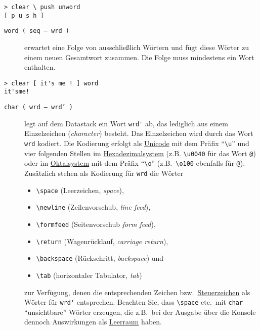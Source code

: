 \begin{verbatim}
> clear \ push unword
[ p u s h ]
\end{verbatim}

\begin{description}
\item[\texttt{word ( seq -- wrd )}] erwartet eine Folge von ausschließlich Wörtern und fügt diese Wörter zu einem neuen Gesamtwort zusammen. Die Folge muss mindestens ein Wort enthalten.
\end{description}

\begin{verbatim}
> clear [ it's me ! ] word
it'sme!
\end{verbatim}

\begin{description}
\item[\texttt{char ( wrd -- wrd' )}] legt auf dem Datastack ein Wort \verb|wrd'| ab, das lediglich aus einem Einzelzeichen (\emph{character}) besteht. Das Einzelzeichen wird durch das Wort \verb|wrd| kodiert. Die Kodierung erfolgt als \href{http://de.wikipedia.org/wiki/Unicode}{Unicode} mit dem Präfix "`\verb|\u|"' und vier folgenden Stellen im \href{http://de.wikipedia.org/wiki/Hexadezimalsystem}{Hexadezimalsystem} (z.B. \verb|\u0040| für das Wort \verb|@|) oder im \href{http://de.wikipedia.org/wiki/Oktalsystem}{Oktalsystem} mit dem Präfix "`\verb|\o|"' (z.B.\ \verb|\o100| ebenfalls für \verb|@|). Zusätzlich stehen als Kodierung für \verb|wrd| die Wörter
\begin{itemize}
\item \verb|\space| (Leerzeichen, \emph{space}),
\item \verb|\newline| (Zeilenvorschub, \emph{line feed}),
\item \verb|\formfeed| (Seitenvorschub \emph{form feed}),
\item \verb|\return| (Wagenrücklauf, \emph{carriage return}),
\item \verb|\backspace| (Rückschritt, \emph{backspace}) und
\item \verb|\tab| (horizontaler Tabulator, \emph{tab})
\end{itemize}
zur Verfügung, denen die entsprechenden Zeichen bzw.\ \href{http://de.wikipedia.org/wiki/Steuerzeichen}{Steuerzeichen} als Wörter für \verb|wrd'| entsprechen. Beachten Sie, dass \verb|\space| etc.\ mit \verb|char| "`unsichtbare"' Wörter erzeugen, die z.B.\ bei der Ausgabe über die Konsole dennoch Auswirkungen als \href{http://de.wikipedia.org/wiki/Leerraum}{Leerraum} haben.
\end{description}

